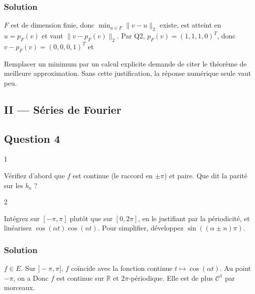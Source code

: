 \documentclass[11pt,a4paper]{article}
\newcommand{\equationajustee}[1]{%
  \sbox{\boiteequation}{$\displaystyle #1$}%
  \ifdim\wd\boiteequation>\linewidth
    \[\resizebox{\linewidth}{!}{\usebox{\boiteequation}}\]%
  \else
    \[#1\]%
  \fi}
\begin{document}
\hypertarget{solution-2}{%
\subsubsection{Solution}\label{solution-2}}

\(F\) est de dimension finie, donc \(\min_{u\in F}\|v-u\|_2\) existe, est atteint en \(u=p_F(v)\) et vaut \(\|v-p_F(v)\|_2\). Par Q2, \(p_F(v)=(1,1,1,0)^T\), donc \(v-p_F(v)=(0,0,0,1)^T\) et
\equationajustee{\boxed{\min_{u\in F}\|v-u\|_2=1.}}

\begin{jury}

Remplacer un minimum par un calcul explicite demande de citer le théorème de meilleure approximation. Sans cette justification, la réponse numérique seule vaut peu.

\end{jury}

\hypertarget{ii-suxe9ries-de-fourier}{%
\subsection{II --- Séries de Fourier}\label{ii-suxe9ries-de-fourier}}

\hypertarget{question-4}{%
\subsection{Question 4}\label{question-4}}

\begin{indication}{1}

Vérifiez d'abord que \(f\) est continue (le raccord en \(\pm\pi\)) et paire. Que dit la parité sur les \(b_n\) ?

\end{indication}

\begin{indication}{2}

Intégrez sur \([-\pi,\pi]\) plutôt que sur \([0,2\pi]\), en le justifiant par la périodicité, et linéarisez \(\cos(\alpha t)\cos(nt)\). Pour simplifier, développez \(\sin((\alpha\pm n)\pi)\).

\end{indication}

\hypertarget{solution-3}{%
\subsubsection{Solution}\label{solution-3}}

\emph{\(f\in E\).} Sur \(]-\pi,\pi]\), \(f\) coïncide avec la fonction continue \(t\mapsto\cos(\alpha t)\). Au point \(-\pi\), on a
\equationajustee{\begin{aligned}
f(-\pi)&=f(\pi)=\cos(\alpha\pi),\\
\lim_{x\to-\pi^+}f(x)&=\cos(-\alpha\pi)=\cos(\alpha\pi).
\end{aligned}}
Donc \(f\) est continue sur \(\mathbb R\) et \(2\pi\)-périodique. Elle est de plus \(\mathcal C^1\) par morceaux.
\end{document}
